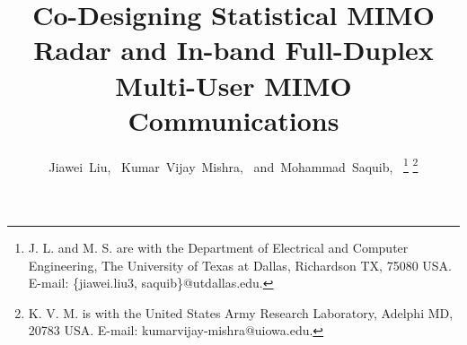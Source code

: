 \documentclass[10pt,journal]{IEEEtran}
\theoremstyle{definition}
\begin{document}
	\setlength{\abovedisplayskip}{3pt}
	\setlength{\belowdisplayskip}{3pt}
	\title{Co-Designing Statistical MIMO Radar and In-band Full-Duplex Multi-User MIMO Communications}
	\author{Jiawei~Liu,~
		Kumar~Vijay~Mishra,~
		and~Mohammad~Saquib,~
		\thanks{J. L. and M. S. are with the Department
			of Electrical and Computer Engineering, The University of Texas at Dallas, Richardson
			TX, 75080 USA. E-mail: \{jiawei.liu3, saquib\}@utdallas.edu.}%
		\thanks{K. V. M. is with the United States Army Research Laboratory, Adelphi MD, 20783 USA. E-mail: kumarvijay-mishra@uiowa.edu.}%
	}
	
	
	
	
	
	
	
	
	
	
	
	
	\maketitle
	
\end{document}
